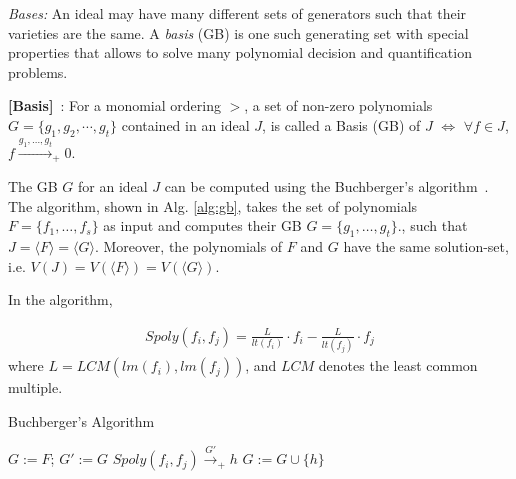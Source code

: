 {\it \Grobner Bases:}
An ideal may have many different sets of generators such that
their varieties are the same. A {\it \Grobner basis} (GB) is
one such generating set with special properties that allows 
to solve many polynomial decision and quantification problems. 
\begin{Definition}
\label{def:gb}
{\bf [\Grobner Basis]}~\cite{gb_book}: 
For a monomial ordering $>$, a set of non-zero polynomials $G =
\{g_1,g_2,\cdots,g_t\}$ contained in an ideal $J$, is called a
\Grobner Basis (GB) of $J$ $\iff$
$\forall f \in J$, $f\xrightarrow{g_1,\dots,g_t}_+0$. 
\end{Definition}
The GB $G$ for an ideal $J$ can be computed using the Buchberger's
algorithm~\cite{buchberger_thesis}. 
The algorithm, shown in Alg. \ref{alg:gb}, takes the set of
polynomials $F = \{f_1,\dots, f_s\}$ as input and computes their
GB $G = \{g_1,\dots, g_t\}$., such that $J = \langle
F\rangle = \langle G\rangle$. Moreover, the polynomials of $F$ and $G$
have the same solution-set, i.e. $V(J) = V(\langle F \rangle) = V(\langle G \rangle)$. 

In the algorithm,

\begin{equation}
\label{spoly}
\begin{split}
Spoly(f_i,f_j) = \frac{L}{lt(f_i)}\cdot f_i - \frac{L}{lt(f_j)}\cdot f_j
\end{split}
\end{equation}
where $L = LCM(lm(f_i),lm(f_j))$, and $LCM$ denotes the least common
multiple. 

\begin{algorithm}
\caption {Buchberger's Algorithm}
\label{alg:gb}
\begin{algorithmic}[1]
  \State $G:= F$;
    \State $G' := G$
      \State $Spoly(f_i, f_j) \stackrel{G'}{\textstyle\longrightarrow}_+h$ 
       \State $G:= G \cup \{h\}$ \EndIf
    \EndFor
  \EndWhile
\end{algorithmic}
\end{algorithm}

